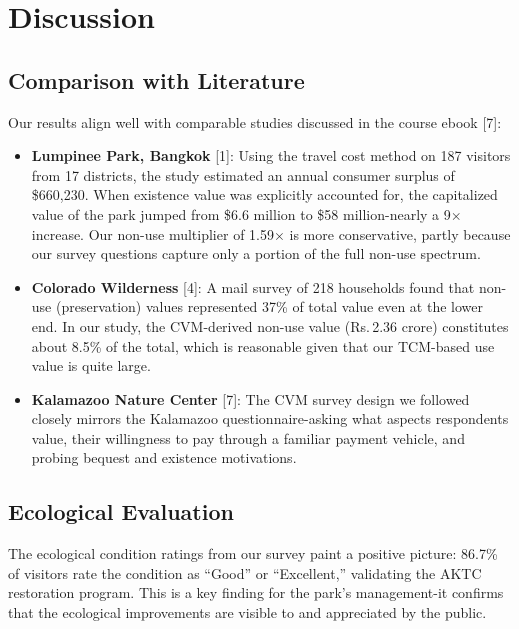 \documentclass[12pt, a4paper]{article}
\newcommand{\rupee}{\textrm{Rs.}\,}
\begin{document}
\section{Discussion}

\subsection{Comparison with Literature}

Our results align well with comparable studies discussed in the course ebook [7]:

\begin{itemize}
    \item \textbf{Lumpinee Park, Bangkok} [1]: Using the travel cost method on 187 visitors from 17 districts, the study estimated an annual consumer surplus of \$660,230. When existence value was explicitly accounted for, the capitalized value of the park jumped from \$6.6 million to \$58 million-nearly a 9$\times$ increase. Our non-use multiplier of 1.59$\times$ is more conservative, partly because our survey questions capture only a portion of the full non-use spectrum.

    \item \textbf{Colorado Wilderness} [4]: A mail survey of 218 households found that non-use (preservation) values represented 37\% of total value even at the lower end. In our study, the CVM-derived non-use value (\rupee 2.36 crore) constitutes about 8.5\% of the total, which is reasonable given that our TCM-based use value is quite large.

    \item \textbf{Kalamazoo Nature Center} [7]: The CVM survey design we followed closely mirrors the Kalamazoo questionnaire-asking what aspects respondents value, their willingness to pay through a familiar payment vehicle, and probing bequest and existence motivations.
\end{itemize}

\subsection{Ecological Evaluation}

The ecological condition ratings from our survey paint a positive picture: 86.7\% of visitors rate the condition as ``Good'' or ``Excellent,'' validating the AKTC restoration program. This is a key finding for the park's management-it confirms that the ecological improvements are visible to and appreciated by the public.
\end{document}
